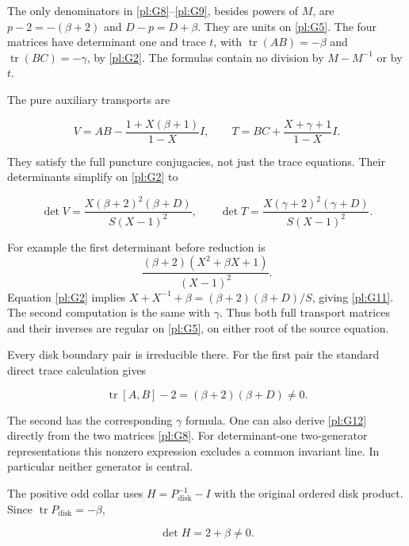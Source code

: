 The only denominators in \eqref{pl:G8}--\eqref{pl:G9}, besides powers of \(M\),
are \(p-2=-(\beta+2)\) and \(D-p=D+\beta\).
They are units on \eqref{pl:G5}. The four matrices have determinant one
and trace \(t\), with
\(\operatorname{tr}(AB)=-\beta\) and
\(\operatorname{tr}(BC)=-\gamma\), by \eqref{pl:G2}.
The formulas contain no division by \(M-M^{-1}\) or by \(t\).

The pure auxiliary transports are

\begin{equation}\label{pl:G10}
V=AB-\frac{1+X(\beta+1)}{1-X}I,\qquad
 T=BC+\frac{X+\gamma+1}{1-X}I.
\end{equation}

They satisfy the full puncture conjugacies, not just the trace
equations. Their determinants simplify on \eqref{pl:G2} to

\begin{equation}\label{pl:G11}
\det V=\frac{X(\beta+2)^2(\beta+D)}{S(X-1)^2},\qquad
 \det T=\frac{X(\gamma+2)^2(\gamma+D)}{S(X-1)^2}.
\end{equation}

For example the first determinant before reduction is
\[
 \frac{(\beta+2)(X^2+\beta X+1)}{(X-1)^2}.
\]
Equation \eqref{pl:G2} implies
\(X+X^{-1}+\beta=(\beta+2)(\beta+D)/S\), giving \eqref{pl:G11}.
The second computation is the same with \(\gamma\).
Thus both full transport matrices and their inverses are regular
on \eqref{pl:G5}, on either root of the source equation.

Every disk boundary pair is irreducible there. For the first
pair the standard direct trace calculation gives

\begin{equation}\label{pl:G12}
\operatorname{tr}[A,B]-2=(\beta+2)(\beta+D)\ne0.
\end{equation}

The second has the corresponding \(\gamma\) formula.
One can also derive \eqref{pl:G12} directly from the two matrices \eqref{pl:G8}.
For determinant-one two-generator representations this
nonzero expression excludes a common invariant line. In
particular neither generator is central.

The positive odd collar uses \(H=P_{\mathrm{disk}}^{-1}-I\)
with the original ordered disk product. Since
\(\operatorname{tr}P_{\mathrm{disk}}=-\beta\),

\begin{equation}\label{pl:G13}
\det H=2+\beta\ne0.
\end{equation}

